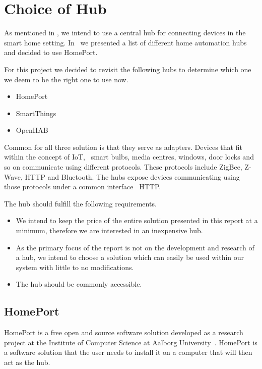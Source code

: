 \section{Choice of Hub}
\label{sec:analysis:choice-of-hub}

As mentioned in , we intend to use a central hub for connecting devices in the smart home setting. In~\cite{prespecialisation} we presented a list of different home automation hubs and decided to use HomePort.

For this project we decided to revisit the following hubs to determine which one we deem to be the right one to use now.

\begin{itemize}
    \item HomePort
    \item SmartThings
    \item OpenHAB
\end{itemize}

Common for all three solution is that they serve as adapters. Devices that fit within the concept of IoT, \eg~smart bulbs, media centres, windows, door locks and so on communicate using different protocols. These protocols include ZigBee, Z-Wave, HTTP and Bluetooth. The hubs expose devices communicating using those protocols under a common interface \eg~HTTP.

The hub should fulfill the following requirements.

\begin{itemize}
\item We intend to keep the price of the entire solution presented in this report at a minimum, therefore we are interested in an inexpensive hub.
\item As the primary focus of the report is not on the development and research of a hub, we intend to choose a solution which can easily be used within our system with little to no modifications.
\item The hub should be commonly accessible.
\end{itemize}

\subsection{HomePort}
\label{sec:analysis:choice-of-hub:homeport}

HomePort is a free open and source software solution developed as a research project at the Institute of Computer Science at Aalborg University~\cite{HOMEPORT10,homeport:github}.
HomePort is a software solution that the user needs to install it on a computer that will then act as the hub.

